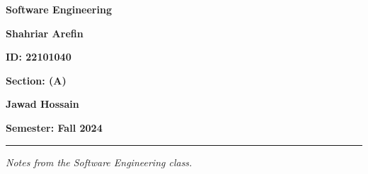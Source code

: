 \begin{titlepage}
   \centering
   \vspace*{1.5cm}
   
   {\Huge {}\par}
   {\Huge\bfseries Software Engineering\par}
   \vspace{1.5cm}
   
   {\LARGE {}\par}
   {\LARGE\textbf{Shahriar Arefin}\par}
   \vspace{0.5cm}
   {\large\textbf{ID: 22101040}\par}
   \vspace{0.5cm}
   {\large\textbf{Section: (A)}\par}

   \vspace{1cm}
   {\LARGE {}\par}
   {\LARGE\textbf{Jawad Hossain}\par}
   \vfill

   {\large\textbf{Semester: Fall 2024}\par}
   \vspace{1cm}

   \hrule \vspace{0.2cm}
   {\small \textit{Notes from the Software Engineering class.}}
\end{titlepage}
